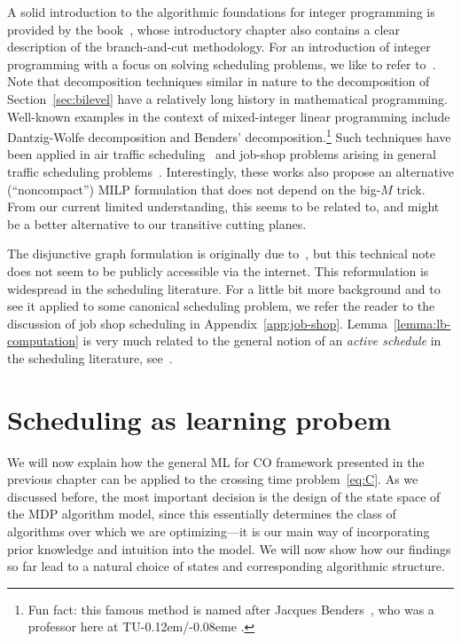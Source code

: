 \documentclass[a4paper]{report}
\theoremstyle{definition}
\theoremstyle{plain}
\newcommand{\TUE}{TU\kern-0.12em/\kern-0.08eme }
\begin{document}
A solid introduction to the algorithmic foundations for integer programming is
provided by the book~\cite{confortiIntegerProgramming2014}, whose introductory chapter also contains a clear
description of the branch-and-cut methodology. For an introduction of integer
programming with a focus on solving scheduling problems, we like to refer
to~\cite[Appendix A]{pinedoSchedulingTheoryAlgorithms2016}.
%
Note that decomposition techniques similar in nature to the decomposition of
Section~\ref{sec:bilevel} have a relatively long history in mathematical programming.
Well-known examples in the context of mixed-integer linear programming include
Dantzig-Wolfe decomposition and Benders' decomposition.\footnote{Fun fact: this
  famous method is named after Jacques
  Benders~\cite{aardalJacquesBendersHis2025}, who was a professor here at \TUE.}
%
Such techniques have been applied in air traffic scheduling~\cite{manninoPathCycleFormulation2018} and job-shop
problems arising in general traffic scheduling problems~\cite{lamorgeseNoncompactFormulationJobShop2019}.
%
Interestingly, these works also propose an alternative (``noncompact'') MILP
formulation that does not depend on the big-$M$ trick. From our current limited
understanding, this seems to be related to, and might be a better alternative to
our transitive cutting planes.

The disjunctive graph formulation is originally due
to~\cite{roy1964disjunctive}, but this technical note does not seem to be
publicly accessible via the internet.
%
This reformulation is widespread in the scheduling literature. For a little bit
more background and to see it applied to some canonical scheduling problem, we
refer the reader to the discussion of job shop scheduling in
Appendix~\ref{app:job-shop}.
%
Lemma~\ref{lemma:lb-computation} is very much related to the general notion of
an \emph{active schedule} in the scheduling literature, see~\cite[Definition
2.3.3]{pinedoSchedulingTheoryAlgorithms2016}.




\chapter{Scheduling as learning probem}\label{chap:single-learning}

We will now explain how the general ML for CO framework presented in the
previous chapter can be applied to the crossing time problem~\eqref{eq:C}.
%
As we discussed before, the most important decision is the design of the state
space of the MDP algorithm model, since this essentially determines the class of
algorithms over which we are optimizing---it is our main way of incorporating
prior knowledge and intuition into the model.
%
We will now show how our findings so far lead
to a natural choice of states and corresponding algorithmic structure.
\end{document}
